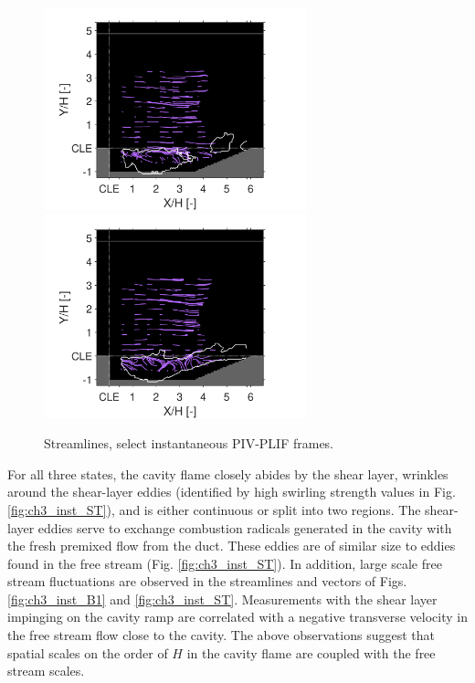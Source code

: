 \begin{figure}
                \newline
         {\includegraphics[width=3in,trim=0.35in 0 0.65in 0, clip]{figures/B1/combustion_instability/streamlines/B1_Frame306_v2.pdf}}
         \hspace{0.4cm}
                {\includegraphics[width=3in,trim=0.35in 0 0.65in 0, clip]{figures/B1/combustion_instability/streamlines/B1_Frame301_v2.pdf}}
\caption{Streamlines, select instantaneous PIV-PLIF frames.}\label{fig:ch3_inst_B1vec}
\end{figure}

For all three states, the cavity flame closely abides by the shear layer, wrinkles around the shear-layer eddies (identified by high swirling strength values in Fig. \ref{fig:ch3_inst_ST}), and is either continuous or split into two regions. The shear-layer eddies serve to exchange combustion radicals generated in the cavity with the fresh premixed flow from the duct. These eddies are of similar size to eddies found in the free stream (Fig. \ref{fig:ch3_inst_ST}). In addition, large scale free stream fluctuations are observed in the streamlines and vectors of Figs. \ref{fig:ch3_inst_B1} and \ref{fig:ch3_inst_ST}. Measurements with the shear layer impinging on the cavity ramp are correlated with a negative transverse velocity in the free stream flow close to the cavity. The above observations suggest that spatial scales on the order of $H$ in the cavity flame are coupled with the free stream scales.

